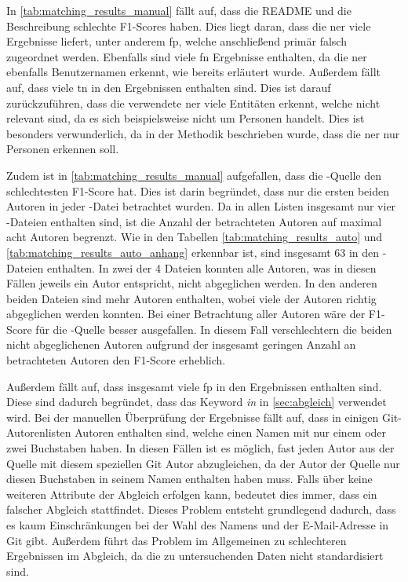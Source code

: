 In \autoref{tab:matching_results_manual} fällt auf, dass die README und die Beschreibung schlechte F1-Scores haben.
Dies liegt daran, dass die \gls{ner} viele Ergebnisse liefert, unter anderem \gls{fp}, welche anschließend primär falsch zugeordnet werden.
Ebenfalls sind viele \gls{fn} Ergebnisse enthalten, da die \gls{ner} ebenfalls Benutzernamen erkennt, wie bereits erläutert wurde.
Außerdem fällt auf, dass viele \gls{tn} in den Ergebnissen enthalten sind.
Dies ist darauf zurückzuführen, dass die verwendete \gls{ner} viele Entitäten erkennt, welche nicht relevant sind, da es sich beispielsweise nicht um Personen handelt.
Dies ist besonders verwunderlich, da in der Methodik beschrieben wurde, dass die \gls{ner} nur Personen erkennen soll.

Zudem ist in \autoref{tab:matching_results_manual} aufgefallen, dass die -Quelle den schlechtesten F1-Score hat.
Dies ist darin begründet, dass nur die ersten beiden Autoren in jeder -Datei betrachtet wurden.
Da in allen Listen insgesamt nur vier -Dateien enthalten sind, ist die Anzahl der betrachteten Autoren auf maximal acht Autoren begrenzt.
Wie in den Tabellen \ref{tab:matching_results_auto} und \ref{tab:matching_results_auto_anhang} erkennbar ist, sind insgesamt 63 in den -Dateien enthalten.
In zwei der 4 Dateien konnten alle Autoren, was in diesen Fällen jeweils ein Autor entspricht, nicht abgeglichen werden.
In den anderen beiden Dateien sind mehr Autoren enthalten, wobei viele der Autoren richtig abgeglichen werden konnten.
Bei einer Betrachtung aller Autoren wäre der F1-Score für die -Quelle besser ausgefallen.
In diesem Fall verschlechtern die beiden nicht abgeglichenen Autoren aufgrund der insgesamt geringen Anzahl an betrachteten Autoren den F1-Score erheblich.

Außerdem fällt auf, dass insgesamt viele \gls{fp} in den Ergebnissen enthalten sind.
Diese sind dadurch begründet, dass das Keyword \emph{in} in \autoref{sec:abgleich} verwendet wird.
Bei der manuellen Überprüfung der Ergebnisse fällt auf, dass in einigen Git-Autorenlisten Autoren enthalten sind, welche einen Namen mit nur einem oder zwei Buchstaben haben.
In diesen Fällen ist es möglich, fast jeden Autor aus der Quelle mit diesem speziellen Git Autor abzugleichen, da der Autor der Quelle nur diesen Buchstaben in seinem Namen enthalten haben muss.
Falls über keine weiteren Attribute der Abgleich erfolgen kann, bedeutet dies immer, dass ein falscher Abgleich stattfindet.
Dieses Problem entsteht grundlegend dadurch, dass es kaum Einschränkungen bei der Wahl des Namens und der E-Mail-Adresse in Git gibt.
Außerdem führt das Problem im Allgemeinen zu schlechteren Ergebnissen im Abgleich, da die zu untersuchenden Daten nicht standardisiert sind.

